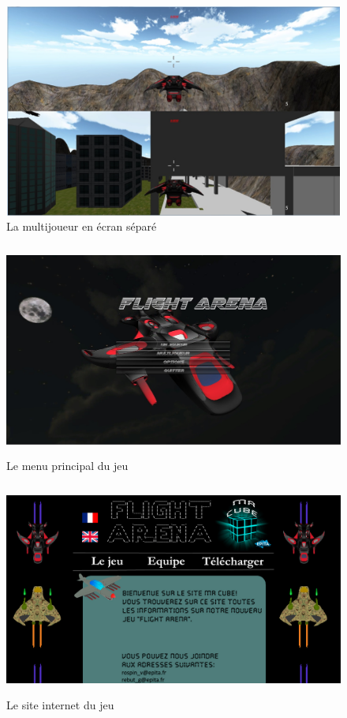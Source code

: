 \documentclass[12pt, titlepage]{article}
\begin{document}
\begin{spacing}{1.5}
\begin{figure}[h]
\center
\includegraphics[height=7cm, width=12cm]{split.jpg}
\caption{La multijoueur en écran séparé}
\end{figure}

\begin{figure}[h]
\center
\includegraphics[height=7cm, width=12cm]{menu_arthur.jpg}
\caption{Le menu principal du jeu}
\end{figure}

\begin{figure}[h]
\center
\includegraphics[height=7cm, width=12cm]{site.png}
\caption{Le site internet du jeu}
\end{figure}


\end{spacing}
\end{document}
